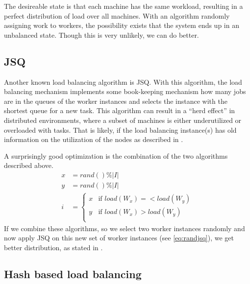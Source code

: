 The desireable state is that each machine has the same workload, resulting in a
perfect distribution of load over all machines.
With an algorithm randomly assigning work to workers, the possibility exists
that the system ends up in an unbalanced state.
Though this is very unlikely, we can do better.

\subsection{\ac{JSQ}}

Another known load balancing algorithm is \ac{JSQ}.
With this algorithm, the load balancing mechanism implements some book-keeping
mechanism how many jobs are in the queues of the worker instances and selects
the instance with the shortest queue for a new task.
This algorithm can result in a ``herd effect'' in distributed environments,
where a subset of machines is either underutilized or overloaded with tasks.
That is likely, if the load balancing instance(s) has old information on the
utilization of the nodes as described in \cite{inpSLoadInfo}.

A surprisingly good optimization is the combination of the two algorithms
described above.
\begin{equation}
    \begin{aligned}
        x &= rand() \% |I| \\
        y &= rand() \% |I| \\
        i &= \begin{cases}
            x & \text{if } load(W_x) =< load(W_y)\\
            y & \text{if } load(W_x) > load(W_y)\\
        \end{cases}
    \end{aligned}
    \label{eq:randjsq}
\end{equation}
If we combine these algorithms, so we select two worker instances randomly and
now apply \ac{JSQ} on this new set of worker instances (see \ref{eq:randjsq}),
we get better distribution, as stated in \cite{powerOfTwoInRLB}.

\subsection{Hash based load balancing}

